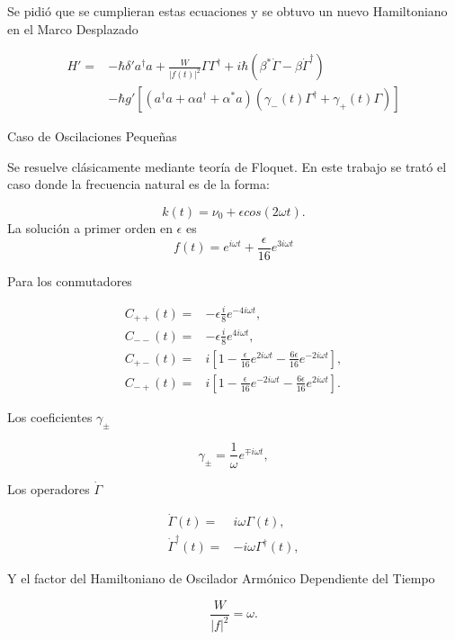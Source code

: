 \documentclass[10pt]{beamer}
\begin{document}
\begin{frame}
Se pidió que se cumplieran estas ecuaciones y se obtuvo un nuevo Hamiltoniano en el Marco Desplazado

\begin{align*}
H'=& \nonumber -\hbar \delta' a^\dagger a + \frac{W}{|f(t)|^2}\Gamma \Gamma^\dagger + i\hbar(\beta^*\dot{\Gamma} - \beta \dot{\Gamma}^\dagger) \\
&-\hbar g'[(a^{\dagger}a +\alpha a^{\dagger}+\alpha^* a)(\gamma_-(t)\Gamma^{\dagger}+\gamma_+(t)\Gamma)]
\end{align*}
\end{frame}

\begin{frame}{Caso de Oscilaciones Pequeñas}

Se resuelve clásicamente mediante teoría de Floquet. En este trabajo se trató el caso donde la frecuencia natural es de la forma:

\begin{equation*}
k(t) = \nu_0 + \epsilon cos(2\omega t).
\end{equation*} La solución a primer orden en $\epsilon$ es
\begin{equation*}
f(t)= e^{i\omega t} + \frac{\epsilon}{16} e^{3i\omega t}
\end{equation*}

\end{frame}


\begin{frame}
Para los conmutadores

\begin{align*}
C_{++}(t) =& -\epsilon\frac{i}{8}e^{-4i\omega t},\\
C_{--}(t) =& -\epsilon\frac{i}{8}e^{4i\omega t},\\
C_{+-}(t) =& i [1 -\frac{\epsilon}{16}e^{2i\omega t}-\frac{6\epsilon}{16}e^{-2i\omega t}],\\
C_{-+}(t) =& i [1 -\frac{\epsilon}{16}e^{-2i\omega t}-\frac{6\epsilon}{16}e^{2i\omega t}].
\end{align*}

\end{frame}

\begin{frame}
Los coeficientes $\gamma_\pm$

\begin{equation*}
\gamma_\pm= \frac{1}{\omega}e^{\mp i\omega t},
\end{equation*}

Los operadores $\dot{\Gamma}$

\begin{align*}
\dot{\Gamma}(t) =& i\omega \Gamma(t),\\
\dot{\Gamma}^\dagger(t) =& -i\omega \Gamma^\dagger(t),
\end{align*}

Y el factor del Hamiltoniano de Oscilador Armónico Dependiente del Tiempo

\begin{equation*}
\frac{W}{|f|^2} = \omega.
\end{equation*}

\end{frame}
\end{document}
